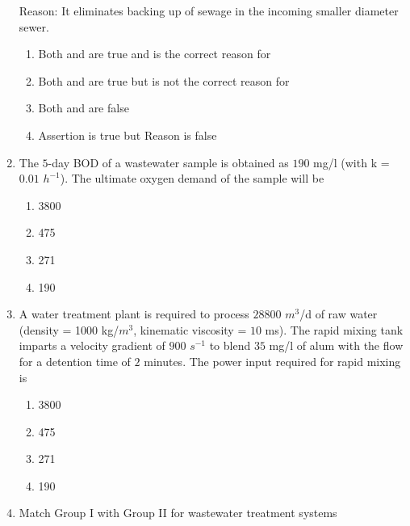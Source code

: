 \documentclass[journal]{IEEEtran}
\begin{document}
\begin{enumerate}
Reason: It eliminates backing up of sewage in the incoming smaller diameter sewer. \textbf{}

\begin{enumerate}
\item Both  and  are true and  is the correct reason for 
\item Both  and  are true but  is not the correct reason for 
\item Both  and  are false 
\item Assertion  is true but Reason is false 
\end{enumerate}     

\item The $5$-day BOD of a wastewater sample is obtained as $190$ mg/l (with k = $0.01$  $h^{-1}$). The ultimate oxygen demand  of the sample will be \textbf{}

\begin{enumerate}
\item 3800
\item 475
\item 271
\item 190
\end{enumerate}  

\item A water treatment plant is required to process $28800$ $m^{3}$/d of raw water (density = 1000 kg/$m^{3}$, kinematic viscosity = $10$ ms). The rapid mixing tank imparts a velocity gradient of $900$ $s^{-1}$ to blend $35$ mg/l of alum with the flow for a detention time of $2$ minutes. The power input  required for rapid mixing is \textbf{}

\begin{enumerate}
\item 3800
\item 475
\item 271
\item 190
\end{enumerate}  

\item Match Group I  with Group II  for wastewater treatment systems \textbf{}


\end{enumerate}
\end{document}
